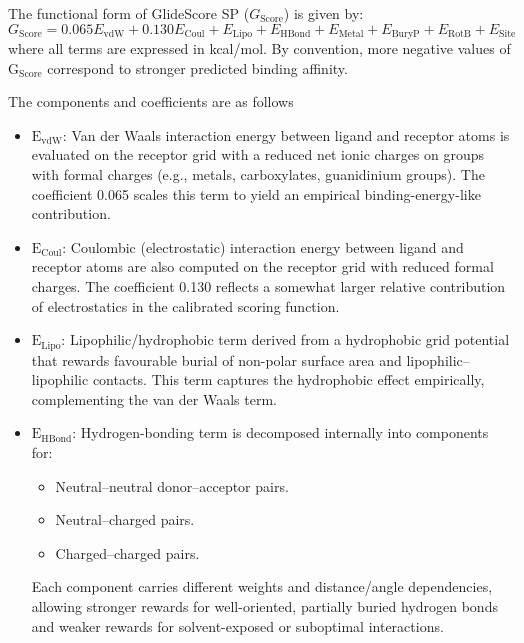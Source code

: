 \documentclass[12pt]{article}
\begin{document}
The functional form of GlideScore SP (\(G_{\textrm{Score}}\)) is given by:
\begin{equation}
  G_{\textrm{Score}} = 0.065 E_{\textrm{vdW}} + 0.130 E_{\textrm{Coul}} + E_{\textrm{Lipo}} + E_{\textrm{HBond}} + E_{\textrm{Metal}} + E_{\textrm{BuryP}} + E_{\textrm{RotB}} + E_{\textrm{Site}}
\end{equation}
where all terms are expressed in kcal/mol. By convention, more negative values of $\textrm{G}_{\textrm{Score}}$ correspond to stronger predicted binding affinity. 

The components and coefficients are as follows
\begin{itemize}
  \item $\textrm{E}_{\textrm{vdW}}$: Van der Waals interaction energy between ligand and receptor atoms is evaluated on the receptor grid with a reduced net ionic charges on groups with formal charges (e.g., metals, carboxylates, guanidinium groups). The coefficient 0.065 scales this term to yield an empirical binding-energy-like contribution. 

  \item $\textrm{E}_{\textrm{Coul}}$: Coulombic (electrostatic) interaction energy between ligand and receptor atoms are also computed on the receptor grid with reduced formal charges. The coefficient 0.130 reflects a somewhat larger relative contribution of electrostatics in the calibrated scoring function.

  \item $\textrm{E}_{\textrm{Lipo}}$: Lipophilic/hydrophobic term derived from a hydrophobic grid potential that rewards favourable burial of non-polar surface area and lipophilic–lipophilic contacts. This term captures the hydrophobic effect empirically, complementing the van der Waals term.

  \item $\textrm{E}_{\textrm{HBond}}$: Hydrogen-bonding term is decomposed internally into components for:
    \begin{itemize}
      \item Neutral–neutral donor–acceptor pairs.
      \item Neutral–charged pairs.
      \item Charged–charged pairs.
    \end{itemize}

Each component carries different weights and distance/angle dependencies, allowing stronger rewards for well-oriented, partially buried hydrogen bonds and weaker rewards for solvent-exposed or suboptimal interactions.


\end{itemize}
\end{document}

